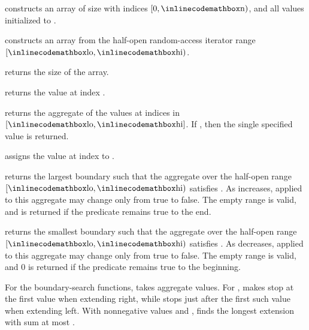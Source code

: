 \begin{compactitem}
  \item {} constructs an array of size  with indices $[0, {\inlinecodemath{n}})$, and all values initialized to .
  \item {} constructs an array from the half-open random-access iterator range $[{\inlinecodemath{lo}}, {\inlinecodemath{hi}})$.
  \item {} returns the size of the array.
  \item {} returns the value at index .
  \item {} returns the aggregate of the values at indices in $[{\inlinecodemath{lo}}, {\inlinecodemath{hi}}]$. If , then the single specified value is returned.
  \item {} assigns the value  at index  to .
  \item {} returns the largest boundary  such that the aggregate over the half-open range $[{\inlinecodemath{lo}}, {\inlinecodemath{hi}})$ satisfies . As  increases,  applied to this aggregate may change only from true to false. The empty range is valid, and  is returned if the predicate remains true to the end.
  \item {} returns the smallest boundary  such that the aggregate over the half-open range $[{\inlinecodemath{lo}}, {\inlinecodemath{hi}})$ satisfies . As  decreases,  applied to this aggregate may change only from true to false. The empty range is valid, and $0$ is returned if the predicate remains true to the beginning.
\end{compactitem}

For the boundary-search functions,  takes aggregate  values. For ,  makes  stop at the first value  when extending right, while  stops just after the first such value when extending left. With nonnegative values and ,  finds the longest extension with sum at most .

